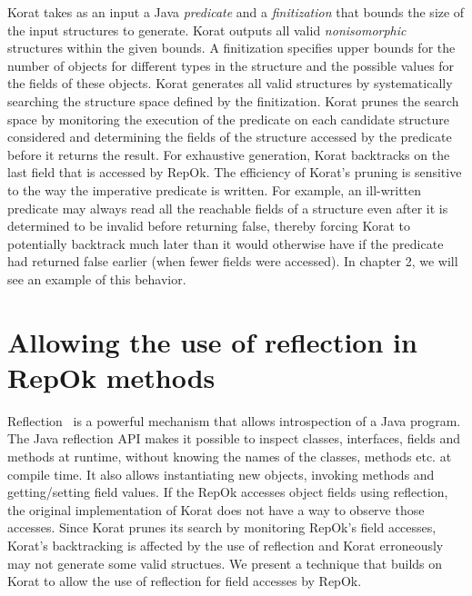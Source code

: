 \para Korat takes as an input a Java \emph{predicate} and a
\emph{finitization} that bounds the size of the input structures to
generate.  Korat outputs all valid \emph{nonisomorphic} structures
within the given bounds. A finitization specifies upper bounds for the
number of objects for different types in the structure and the
possible values for the fields of these objects. Korat generates all
valid structures by systematically searching the structure space
defined by the finitization. Korat prunes the search space by
monitoring the execution of the predicate on each candidate structure
considered and determining the fields of the structure accessed by the
predicate before it returns the result. For exhaustive generation,
Korat backtracks on the last field that is accessed by RepOk.  The
efficiency of Korat's pruning is sensitive to the way the imperative
predicate is written. For example, an ill-written predicate may always
read all the reachable fields of a structure even after it is
determined to be invalid before returning false, thereby forcing Korat
to potentially backtrack much later than it would otherwise have if
the predicate had returned false earlier (when fewer fields were
accessed).  In chapter 2, we will see an example of this behavior.

\section{Allowing the use of reflection in RepOk methods}

Reflection~\cite{...} is a powerful mechanism that allows
introspection of a Java program.  The Java reflection API makes it
possible to inspect classes, interfaces, fields and methods at
runtime, without knowing the names of the classes, methods etc. at
compile time. It also allows instantiating new objects, invoking
methods and getting/setting field values.  If the RepOk accesses
object fields using reflection, the original implementation of Korat
does not have a way to observe those accesses.  Since Korat prunes its
search by monitoring RepOk's field accesses, Korat's backtracking is
affected by the use of reflection and Korat erroneously may not
generate some valid structues.  We present a technique that builds on
Korat to allow the use of reflection for field accesses by RepOk.


